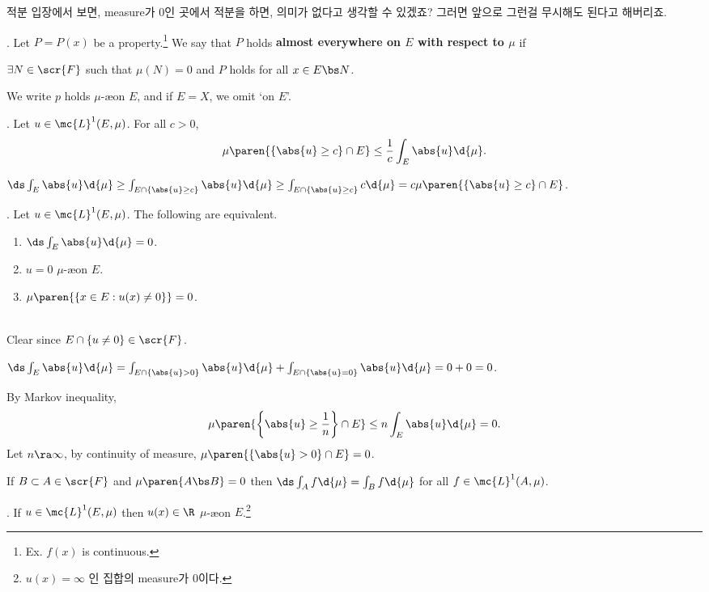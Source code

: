 \pagebreak

적분 입장에서 보면, measure가 0인 곳에서 적분을 하면, 의미가 없다고 생각할 수 있겠죠? 그러면 앞으로 그런걸 무시해도 된다고 해버리죠.

.  Let \(P = P(x)\) be a property.\footnote{Ex. \(f(x)\) is continuous.} We say that \(P\) holds \textbf{almost everywhere on \(E\) with respect to \(\mu\)} if
\begin{center}
    \(\exists N \in \scr{F}\) such that \(\mu(N) = 0\) and \(P\) holds for all \(x \in E \bs N\).
\end{center}

\notation We write \(p\) holds \(\mu\)-\ae on \(E\), and if \(E = X\), we omit `on \(E\)'.

\thm.  Let \(u \in \mc{L}^{1}(E, \mu)\). For all \(c > 0\),
\[
    \mu\paren{\{\abs{u} \geq c\} \cap E} \leq \frac{1}{c} \int_E \abs{u} \d{\mu}.
\]

\pf \(\ds \int_E \abs{u} \d{\mu} \geq \int_{E\cap \{\abs{u}\geq c\}} \abs{u} \d{\mu} \geq \int_{E\cap \{\abs{u}\geq c\}} c \d{\mu} = c \mu\paren{\{\abs{u} \geq c\} \cap E}\).

\thm. Let \(u\in \mc{L}^{1}(E, \mu)\). The following are equivalent.
\begin{enumerate}
    \item \(\ds \int_E \abs{u} \d{\mu} = 0\).
    \item \(u = 0\) \(\mu\)-\ae on \(E\).
    \item \(\mu\paren{\{x \in E : u(x) \neq 0\}} = 0\).
\end{enumerate}

\pf \\
 Clear since \(E\cap\{u\neq 0\} \in \scr{F}\).

 \(\ds \int_E \abs{u} \d{\mu} = \int_{E \cap \{\abs{u} > 0\}} \abs{u} \d{\mu} + \int_{E \cap \{\abs{u} = 0\}} \abs{u} \d{\mu} = 0 + 0 = 0\).

 By Markov inequality,
\[
    \mu\paren{\left\{\abs{u} \geq \frac{1}{n}\right\} \cap E} \leq n\int_E \abs{u} \d{\mu} = 0.
\]
Let \(n\ra \infty\), by continuity of measure, \(\mu\paren{\{\abs{u} > 0\} \cap E} = 0\).

\rmk If \(B \subset A \in \scr{F}\) and \(\mu\paren{A \bs B} = 0\) then \(\ds \int_A f \d{\mu} = \int_B f \d{\mu}\) for all \(f \in \mc{L}^{1}(A, \mu)\).

\thm. If \(u \in \mc{L}^{1}(E, \mu)\) then \(u(x) \in \R\) \(\mu\)-\ae on \(E\).\footnote{\(u(x) = \infty\) 인 집합의 measure가 0이다.}

